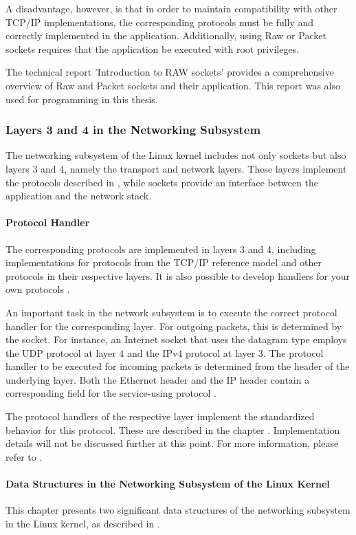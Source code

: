 A disadvantage, however, is that in order to maintain compatibility with other TCP/IP implementations, the corresponding protocols must be fully and correctly implemented in the application. Additionally, using Raw or Packet sockets requires that the application be executed with root privileges.

The technical report 'Introduction to RAW sockets' \cite{sock07} provides a comprehensive overview of Raw and Packet sockets and their application. This report was also used for programming in this thesis.



\subsubsection{Layers 3 and 4 in the Networking Subsystem}
The networking subsystem of the Linux kernel includes not only sockets but also layers 3 and 4, namely the transport and network layers. These layers implement the protocols described in \label{chap:ProtosRefModel}, while sockets provide an interface between the application and the network stack.

\paragraph{Protocol Handler}
The corresponding protocols are implemented in layers 3 and 4, including implementations for protocols from the TCP/IP reference model and other protocols in their respective layers. It is also possible to develop handlers for your own protocols \cite{lins06}.

An important task in the network subsystem is to execute the correct protocol handler for the corresponding layer. For outgoing packets, this is determined by the socket. For instance, an Internet socket that uses the datagram type employs the UDP protocol at layer 4 and the IPv4 protocol at layer 3. The protocol handler to be executed for incoming packets is determined from the header of the underlying layer. Both the Ethernet header and the IP header contain a corresponding field for the service-using protocol \cite{lins06}.

The protocol handlers of the respective layer implement the standardized behavior for this protocol. These are described in the chapter \label{chap:ProtosRefModel}. Implementation details will not be discussed further at this point. For more information, please refer to \cite{lins01}.

\paragraph{Data Structures in the Networking Subsystem of the Linux Kernel}
This chapter presents two significant data structures of the networking subsystem in the Linux kernel, as described in \cite{lins06}.

